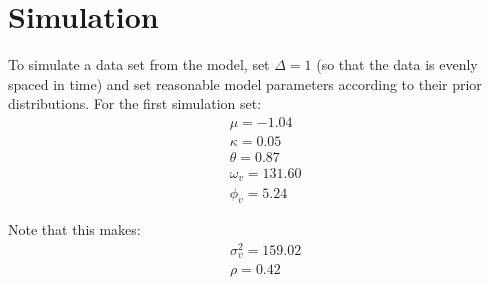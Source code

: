 \documentclass{article}
\begin{document}
\section{Simulation}
\normalsize
To simulate a data set from the model, set $\Delta=1$ (so that the data is evenly spaced in time) and set reasonable model parameters according to their prior distributions.
For the first simulation set:
\begin{equation}
\begin{split}
&\mu=-1.04 \\
&\kappa=0.05 \\
&\theta=0.87 \\
&\omega_v=131.60 \\
&\phi_v=5.24
\end{split}
\end{equation}

Note that this makes:
\begin{equation}
\begin{split}
&\sigma_v^2=159.02 \\
&\rho=0.42
\end{split}
\end{equation}





\end{document}
